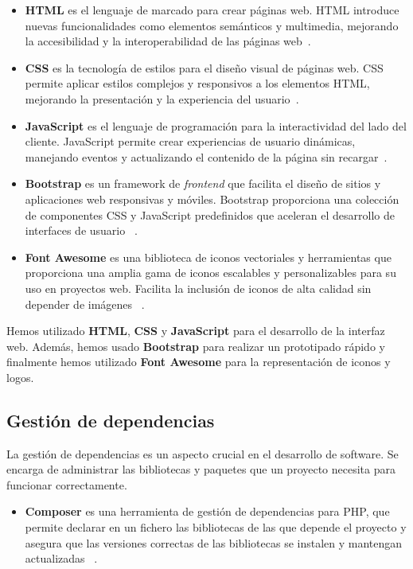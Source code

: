 \begin{itemize}
    \item \textbf{HTML} es el lenguaje de marcado para crear páginas web.
    HTML introduce nuevas funcionalidades como elementos semánticos y multimedia, mejorando la accesibilidad y la
    interoperabilidad de las páginas web~\cite{url_html5}.
    \item \textbf{CSS} es la tecnología de estilos para el diseño visual de páginas web.
    CSS permite aplicar estilos complejos y responsivos a los elementos HTML, mejorando la presentación y la
    experiencia del usuario~\cite{url_css3}.
    \item \textbf{JavaScript} es el lenguaje de programación para la interactividad del lado del cliente.
    JavaScript permite crear experiencias de usuario dinámicas, manejando eventos y actualizando el contenido de la
    página sin recargar~\cite{url_javascript}.
    \item \textbf{Bootstrap} es un framework de \textit{frontend} que facilita el diseño de sitios y aplicaciones web
    responsivas y móviles.
    Bootstrap proporciona una colección de componentes CSS y JavaScript predefinidos que aceleran el desarrollo de
    interfaces de usuario ~\cite{url_bootstrap}.
    \item \textbf{Font Awesome} es una biblioteca de iconos vectoriales y herramientas que proporciona una amplia
    gama de iconos escalables y personalizables para su uso en proyectos web.
    Facilita la inclusión de iconos de alta calidad sin depender de imágenes ~\cite{url_fontawesome}.
\end{itemize}

Hemos utilizado \textbf{HTML}, \textbf{CSS} y \textbf{JavaScript} para el desarrollo de la interfaz web.
Además, hemos usado \textbf{Bootstrap} para realizar un prototipado rápido y finalmente hemos utilizado
\textbf{Font Awesome} para la representación de iconos y logos.


\subsection*{Gestión de dependencias}

La gestión de dependencias es un aspecto crucial en el desarrollo de software.
Se encarga de administrar las bibliotecas y paquetes que un proyecto necesita para funcionar correctamente.

\begin{itemize}
    \item \textbf{Composer}
    es una herramienta de gestión de dependencias para PHP, que permite declarar en un fichero las bibliotecas de las
    que depende el proyecto y asegura que las versiones correctas de las bibliotecas se instalen y mantengan
    actualizadas ~\cite{url_composer}.
\end{itemize}

